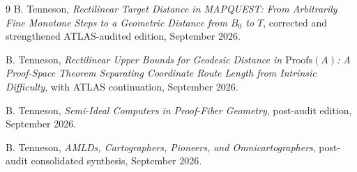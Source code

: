 \documentclass[11pt]{article}
\theoremstyle{definition}
\theoremstyle{remark}
\begin{document}
\begin{thebibliography}{9}
B. Tenneson,
\emph{Rectilinear Target Distance in MAPQUEST: From Arbitrarily Fine Monotone Steps to a Geometric Distance from $B_0$ to $T$}, corrected and strengthened ATLAS-audited edition, September 2026.

B. Tenneson,
\emph{Rectilinear Upper Bounds for Geodesic Distance in $\mathrm{Proofs}(A)$: A Proof-Space Theorem Separating Coordinate Route Length from Intrinsic Difficulty}, with ATLAS continuation, September 2026.

B. Tenneson,
\emph{Semi-Ideal Computers in Proof-Fiber Geometry}, post-audit edition, September 2026.

B. Tenneson,
\emph{AMLDs, Cartographers, Pioneers, and Omnicartographers}, post-audit consolidated synthesis, September 2026.
\end{thebibliography}
\end{document}
